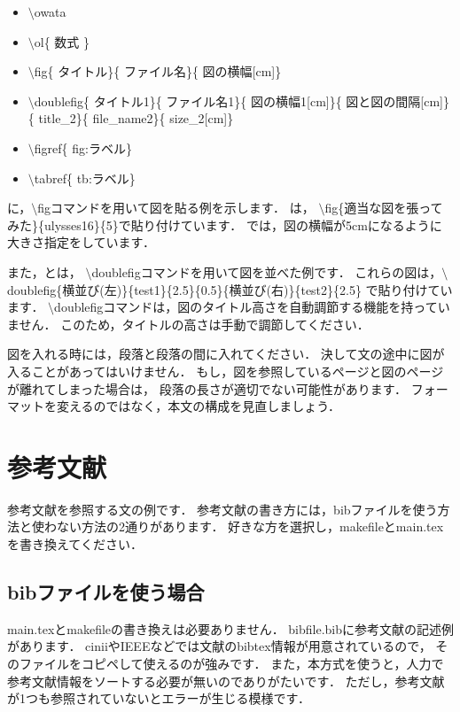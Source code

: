 \begin{itemize}
\item $\setminus$owata
\item $\setminus$ol\{ 数式 \}
\item $\setminus$fig\{ タイトル\}\{ ファイル名\}\{ 図の横幅[cm]\}
\item $\setminus$doublefig\{ タイトル1\}\{ ファイル名1\}\{ 図の横幅1[cm]\}\{ 図と図の間隔[cm]\}\{ title\_2\}\{ file\_name2\}\{ size\_2[cm]\}
\item $\setminus$figref\{ fig:ラベル\}
\item $\setminus$tabref\{ tb:ラベル\}
\end{itemize}


に，$\setminus$figコマンドを用いて図を貼る例を示します．
は，
$\setminus$fig\{適当な図を張ってみた\}\{ulysses16\}\{5\}で貼り付けています．
では，図の横幅が5cmになるように大きさ指定をしています．


また，とは，
$\setminus$doublefigコマンドを用いて図を並べた例です．
これらの図は，$\setminus$doublefig\{横並び(左)\}\{test1\}\{2.5\}\{0.5\}\{横並び(右)\}\{test2\}\{2.5\}
で貼り付けています．
$\setminus$doublefigコマンドは，図のタイトル高さを自動調節する機能を持っていません．
このため，タイトルの高さは手動で調節してください．


図を入れる時には，段落と段落の間に入れてください．
決して文の途中に図が入ることがあってはいけません．
もし，図を参照しているページと図のページが離れてしまった場合は，
段落の長さが適切でない可能性があります．
フォーマットを変えるのではなく，本文の構成を見直しましょう．


\section{参考文献}
\label{sec:bib}
参考文献を参照する文の例です\cite{1983_Ibaraki}．
参考文献の書き方には，bibファイルを使う方法と使わない方法の2通りがあります．
好きな方を選択し，makefileとmain.texを書き換えてください．

\subsection{bibファイルを使う場合}
main.texとmakefileの書き換えは必要ありません．
bibfile.bibに参考文献の記述例があります．
ciniiやIEEEなどでは文献のbibtex情報が用意されているので，
そのファイルをコピペして使えるのが強みです．
また，本方式を使うと，人力で参考文献情報をソートする必要が無いのでありがたいです．
ただし，参考文献が1つも参照されていないとエラーが生じる模様です\cite{test1}．

